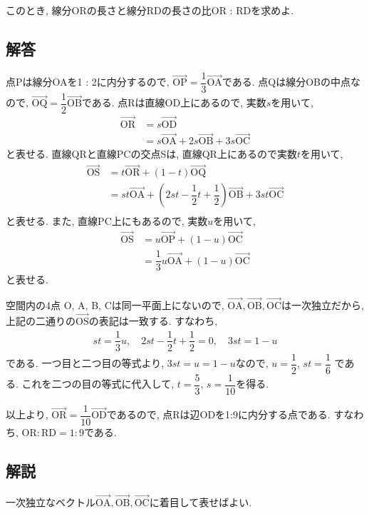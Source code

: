 \documentclass[dvipdfmx,a4paper]{jsarticle}
\newcommand{\posv}[1]{\overrightarrow{\mathrm{#1}}}
\newcommand{\2}{I\hspace{-1pt}I}
\newcommand{\3}{I\hspace{-1pt}I\hspace{-1pt}I}
\begin{document}
    このとき, 線分ORの長さと線分RDの長さの比OR : RDを求めよ. 
    \subsection{解答}
    点Pは線分OAを1 : 2に内分するので, $\posv{OP} = \dfrac{1}{3}\posv{OA}$である. 
    点Qは線分OBの中点なので, $\posv{OQ} = \dfrac{1}{2}\posv{OB}$である. 
    点Rは直線OD上にあるので, 実数$s$を用いて, 
    \begin{align*}
        \posv{OR} &= s \posv{OD} \\
        &= s\posv{OA} + 2s\posv{OB} + 3s\posv{OC}
    \end{align*}
    と表せる. 直線QRと直線PCの交点Sは, 直線QR上にあるので実数$t$を用いて, 
    \begin{align*}
        \posv{OS} &= t \posv{OR} + (1-t) \posv{OQ}\\
        &= st\posv{OA} + \left(2st-\dfrac{1}{2}t+\dfrac{1}{2}\right)\posv{OB} + 3st\posv{OC} \\
    \end{align*}
    と表せる. また, 直線PC上にもあるので, 実数$u$を用いて, 
    \begin{align*}
        \posv{OS} &= u \posv{OP} + (1-u) \posv{OC}\\
        &= \dfrac{1}{3}u \posv{OA} + (1-u) \posv{OC}
    \end{align*}
    と表せる. 
    
    空間内の4点 O, A, B, Cは同一平面上にないので, $\posv{OA},\posv{OB},\posv{OC}$は一次独立だから, 
    上記の二通りの$\posv{OS}$の表記は一致する. すなわち, 
    \begin{align*}
        st = \dfrac{1}{3}u, \quad 2st-\dfrac{1}{2}t+\dfrac{1}{2} = 0, \quad 3st = 1-u
    \end{align*}
    である. 一つ目と二つ目の等式より, $3st=u=1-u$なので, $u = \dfrac{1}{2}$, $st = \dfrac{1}{6}$
    である. これを二つの目の等式に代入して, $t = \dfrac{5}{3}$, $s = \dfrac{1}{10}$を得る. 

    以上より, $\posv{OR} =  \dfrac{1}{10}\posv{OD}$であるので, 点Rは辺ODを1:9に内分する点である. 
    すなわち, $\mathrm{OR} : \mathrm{RD} = 1:9$である. 

    \subsection{解説}
    一次独立なベクトル$\posv{OA},\posv{OB},\posv{OC}$に着目して表せばよい. 
\end{document}

